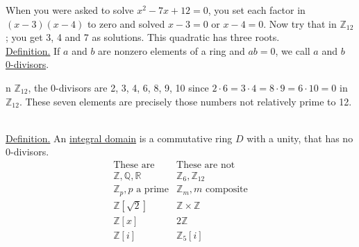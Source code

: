 \documentclass[12pt]{book}
\theoremstyle{definition}
\def\Z{\mathbb{Z}}
\begin{document}
When you were asked to solve $x^2-7x+12=0$, you set each factor in $(x-3)(x-4)$ to zero and solved $x-3=0$ or $x-4=0$.  Now try that in $\Z_{12}$; you get 3, 4 and 7 as solutions.  This quadratic has three roots.\\
\underline{Definition.} If $a$ and $b$ are nonzero elements of a ring and $ab=0$, we call $a$ and $b$ \underline{0-divisors}.\\
\begin{tcexample}{}{}
n $\Z_{12}$, the 0-divisors are 2, 3, 4, 6, 8, 9, 10 since $2\cdot6=3\cdot4=8\cdot9=6\cdot10=0$ in $\Z_{12}$.  These seven elements are precisely those numbers not relatively prime to 12.
\end{tcexample}
~\\[.1in]
%
\underline{Definition.} An \underline{integral domain} is a commutative ring $D$ with a unity, that has no 0-divisors.
$$\begin{array}{c|c}
\text{These are} & \text{These are not}\\
\hline
\Z,\mathbb{Q},\mathbb{R} & \Z_6, \Z_{12}\\
\Z_p, p \text{ a prime} & \Z_m, m\text{ composite}\\
\Z[\sqrt2] & \Z\times \Z\\
\Z[x] & 2\Z\\
\Z[i] &  \Z_5[i]
\end{array}$$\\[.2in]
\end{document}
